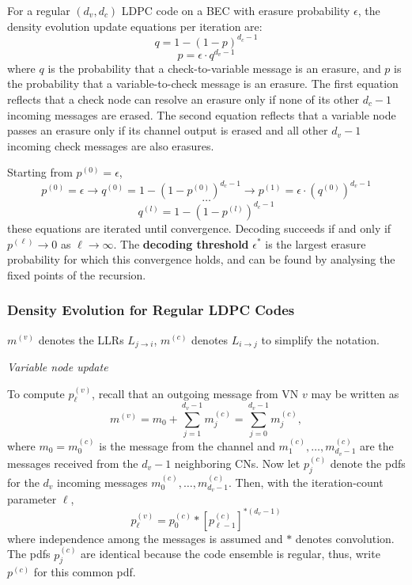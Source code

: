 \documentclass[11pt]{article}
\begin{document}
For a regular $(d_v, d_c)$ LDPC code on a BEC with erasure probability $\epsilon$, the density evolution update equations per iteration are:
\[
q = 1 - (1 - p)^{d_c - 1} 
\]
\[
p = \epsilon \cdot q^{d_v - 1}
\]
where $q$ is the probability that a check-to-variable message is an erasure, and $p$ is the probability that a variable-to-check message is an erasure. The first equation reflects that a check node can resolve an erasure only if none of its other $d_c - 1$ incoming messages are erased. The second equation reflects that a variable node passes an erasure only if its channel output is erased and all other $d_v - 1$ incoming check messages are also erasures.

Starting from $p^{(0)} = \epsilon$,  
\[
p^{(0)} = \epsilon
\to
q^{(0)} = 1 - (1 - p^{(0)})^{d_c - 1} 
\to
p^{(1)} = \epsilon \cdot (q^{(0)})^{d_v - 1}
\]
\[
\dots
\]
\[
q^{(l)} = 1 - (1 - p^{(l)})^{d_c - 1}
\]
these equations are iterated until convergence. Decoding succeeds if and only if $p^{(\ell)} \to 0$ as $\ell \to \infty$. The \textbf{decoding threshold} $\epsilon^*$ is the largest erasure probability for which this convergence holds, and can be found by analysing the fixed points of the recursion.


\subsubsection{Density Evolution for Regular LDPC Codes}

$m^{(v)}$ denotes the LLRs $L_{j\to i}$, $m^{(c)}$ denotes $L_{i \to j}$ to simplify the notation.
\par\medskip
\par\medskip
\noindent \textit{Variable node update}

To compute $p_{\ell}^{(v)}$, recall that an outgoing message from VN $v$ may be written as
\[
m^{(v)} = m_0 + \sum_{j=1}^{d_v-1} m_j^{(c)} = \sum_{j=0}^{d_v-1} m_j^{(c)},
\]
where $m_0 = m_0^{(c)}$ is the message from the channel and $m_1^{(c)},\ldots,m_{d_v-1}^{(c)}$ are the messages received from the $d_v-1$ neighboring CNs. Now let $p_j^{(c)}$ denote the pdfs for the $d_v$ incoming messages $m_0^{(c)},\ldots,m_{d_v-1}^{(c)}$. Then, with the iteration-count parameter $\ell$,
\[
p^{(v)}_{\ell}
= p_0^{(c)} * \left[p^{(c)}_{\ell - 1}\right]^{*(d_v-1)}
\]
where independence among the messages is assumed and $*$ denotes convolution. The pdfs $p_j^{(c)}$ are identical because the code ensemble is regular, thus, write $p^{(c)}$ for this common pdf. 
\end{document}
